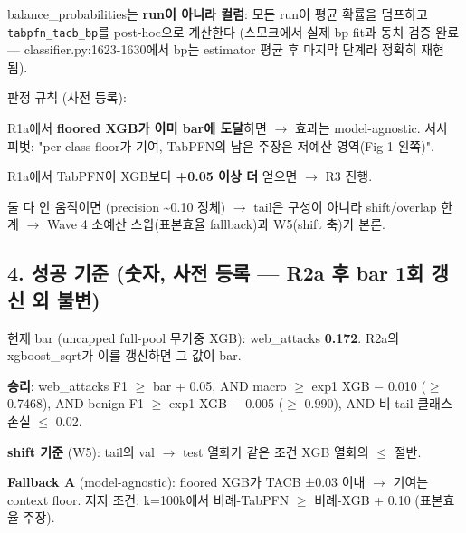 \endgroup
balance\_\allowbreak{}probabilities는 \textbf{run이 아니라 컬럼}: 모든 run이 평균 확률을 덤프하고 \texttt{tabpfn\_\allowbreak{}\allowbreak{}t\allowbreak{}acb\_\allowbreak{}\allowbreak{}bp}를 post-hoc으로 계산한다 (스모크에서 실제 bp fit과 동치 검증 완료 — classifier.py:1623-1630에서 bp는 estimator 평균 후 마지막 단계라 정확히 재현됨).

판정 규칙 (사전 등록):

\par\noindent \textbullet\enspace R1a에서 \textbf{floored XGB가 이미 bar에 도달}하면  \ensuremath{\rightarrow}  효과는 model-agnostic. 서사 피벗: "per-class floor가 기여, TabPFN의 남은 주장은 저예산 영역(Fig 1 왼쪽)".


\par\noindent \textbullet\enspace R1a에서 TabPFN이 XGB보다 \textbf{+\allowbreak{}0.05 이상 더} 얻으면  \ensuremath{\rightarrow}  R3 진행.


\par\noindent \textbullet\enspace 둘 다 안 움직이면 (precision \textasciitilde{}0.10 정체)  \ensuremath{\rightarrow}  tail은 구성이 아니라 shift/\allowbreak{}overlap 한계  \ensuremath{\rightarrow}  Wave 4 소예산 스윕(표본효율 fallback)과 W5(shift 축)가 본론.


\subsection{4. 성공 기준 (숫자, 사전 등록 — R2a 후 bar 1회 갱신 외 불변)}
현재 bar (uncapped full-pool 무가중 XGB): web\_\allowbreak{}attacks \textbf{0.172}. R2a의 xgboost\_\allowbreak{}sqrt가 이를 갱신하면 그 값이 bar.

\par\noindent \textbullet\enspace \textbf{승리}: web\_\allowbreak{}attacks F1 \ensuremath{\geq} bar +\allowbreak{} 0.05, AND macro \ensuremath{\geq} exp1 XGB − 0.010 (\ensuremath{\geq} 0.7468), AND benign F1 \ensuremath{\geq} exp1 XGB − 0.005 (\ensuremath{\geq} 0.990), AND 비-tail 클래스 손실 \ensuremath{\leq} 0.02.


\par\noindent \textbullet\enspace \textbf{shift 기준} (W5): tail의 val \ensuremath{\rightarrow} test 열화가 같은 조건 XGB 열화의 \ensuremath{\leq} 절반.


\par\noindent \textbullet\enspace \textbf{Fallback A} (model-agnostic): floored XGB가 TACB ±0.03 이내  \ensuremath{\rightarrow}  기여는 context floor. 지지 조건: k=\allowbreak{}100k에서 비례-TabPFN \ensuremath{\geq} 비례-XGB +\allowbreak{} 0.10 (표본효율 주장).


